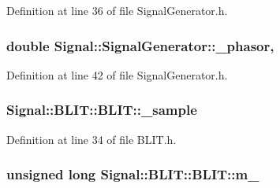 Definition at line 36 of file Signal\+Generator.\+h.

\hypertarget{classSignal_1_1SignalGenerator_af4aa0728ded00777be26a06d883eaeb3}{
\subsubsection[{\+\_\+phasor}]{\setlength{\rightskip}{0pt plus 5cm}double Signal\+::\+Signal\+Generator\+::\+\_\+phasor\hspace{0.3cm}{\ttfamily [protected]}, {\ttfamily [inherited]}}}\label{classSignal_1_1SignalGenerator_af4aa0728ded00777be26a06d883eaeb3}


Definition at line 42 of file Signal\+Generator.\+h.

\hypertarget{classSignal_1_1BLIT_1_1BLIT_ae3db6ee922897295fdf93a3b3c3dfadd}{
\subsubsection[{\+\_\+sample}]{ Signal\+::\+B\+L\+I\+T\+::\+B\+L\+I\+T\+::\+\_\+sample\hspace{0.3cm}{\ttfamily [protected]}}}\label{classSignal_1_1BLIT_1_1BLIT_ae3db6ee922897295fdf93a3b3c3dfadd}


Definition at line 34 of file B\+L\+I\+T.\+h.

\hypertarget{classSignal_1_1BLIT_1_1BLIT_a314aae37a0a53fa3f79a4466b9558fa5}{
\subsubsection[{m\+\_\+}]{\setlength{\rightskip}{0pt plus 5cm}unsigned long Signal\+::\+B\+L\+I\+T\+::\+B\+L\+I\+T\+::m\+\_\+\hspace{0.3cm}{\ttfamily [protected]}}}\label{classSignal_1_1BLIT_1_1BLIT_a314aae37a0a53fa3f79a4466b9558fa5}


